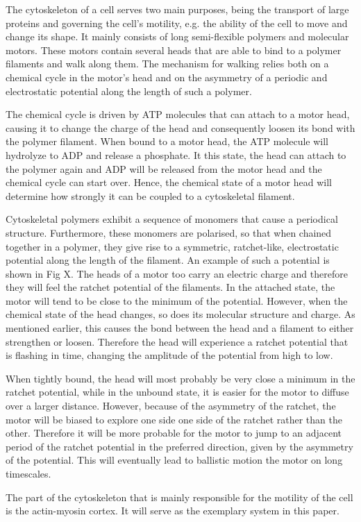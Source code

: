 \documentclass[aps,pre,onecolumn,showpacs,showkeys,a4paper]{revtex4}
\begin{document}
The cytoskeleton of a cell serves two main purposes, being the transport of large proteins and governing the cell's motility, e.g. the ability of the cell to move and change its shape. It mainly consists of long semi-flexible polymers and molecular motors. These motors contain several heads that are able to bind to a polymer filaments and walk along them. The mechanism for walking relies both on a chemical cycle in the motor's head and on the asymmetry of a periodic and electrostatic potential along the length of such a polymer.\par
The chemical cycle is driven by ATP molecules that can attach to a motor head, causing it to change the charge of the head and consequently loosen its bond with the polymer filament. When bound to a motor head, the ATP molecule will hydrolyze to ADP and release a phosphate. It this state, the head can attach to the polymer again and ADP will be released from the motor head and the chemical cycle can start over. Hence, the chemical state of a motor head will determine how strongly it can be coupled to a cytoskeletal filament. \par
Cytoskeletal polymers exhibit a sequence of monomers that cause a periodical structure. Furthermore, these monomers are polarised, so that when chained together in a polymer, they give rise to a symmetric, ratchet-like, electrostatic potential along the length of the filament. An example of such a potential is shown in Fig X. The heads of a motor too carry an electric charge and therefore they will feel the ratchet potential of the filaments. In the attached state, the motor will tend to be close to the minimum of the potential. However, when the chemical state of the head changes, so does its molecular structure and charge. As mentioned earlier, this causes the bond between the head and a filament to either strengthen or loosen. Therefore the head will experience a ratchet potential that is flashing in time, changing the amplitude of the potential from high to low.\par

When tightly bound, the head will most probably be very close a minimum in the ratchet potential, while in the unbound state, it is easier for the motor to diffuse over a larger distance. However, because of the asymmetry of the ratchet, the motor will be biased to explore one side one side of the ratchet rather than the other. Therefore it will be more probable for the motor to jump to an adjacent period of the ratchet potential in the preferred direction, given by the asymmetry of the potential. This will eventually lead to ballistic motion the motor on long timescales.\par
The part of the cytoskeleton that is mainly responsible for the motility of the cell is the actin-myosin cortex.  It will serve as the exemplary system in this paper.\par
\end{document}
